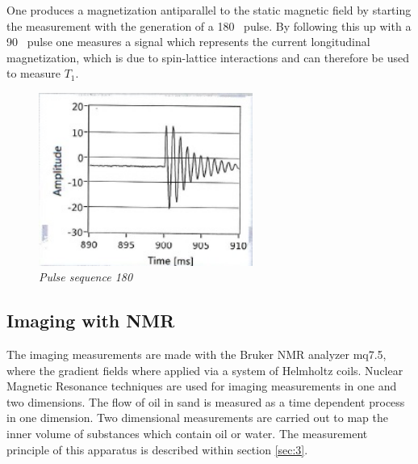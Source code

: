 One produces a magnetization antiparallel to the static magnetic field by starting the measurement with the generation of a 180 \textdegree\, pulse. By following this up with a 90 \textdegree\, pulse one measures a signal which represents the current longitudinal magnetization, which is due to spin-lattice interactions and can therefore be used to measure $T_1$.\cite{manual}
\begin{figure}[h]
\includegraphics[width=70mm]{T_1}
\centering
\caption{\itshape Pulse sequence 180  \textdegree }
\label{fig:3}
\end{figure}
\subsection{Imaging with NMR}
The imaging measurements are made with the Bruker NMR analyzer mq7.5, where the gradient fields where applied via a system of Helmholtz coils. Nuclear Magnetic Resonance techniques are used for imaging measurements in one and two dimensions. The flow of oil in sand is measured as a time dependent process in one dimension. Two dimensional measurements are carried out to map the inner volume of substances which contain oil or water. The measurement principle of this apparatus is described within section \ref{sec:3}.\cite{manual}

